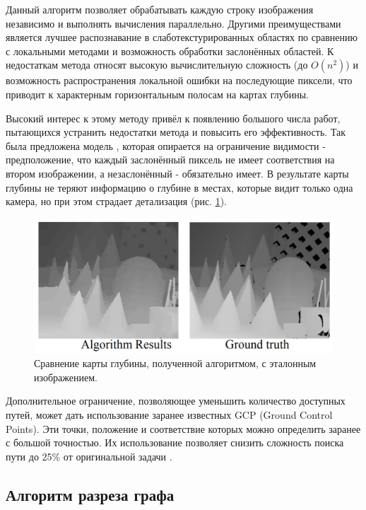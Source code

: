 Данный алгоритм позволяет обрабатывать каждую строку изображения независимо и выполнять вычисления параллельно. Другими преимуществами является лучшее распознавание в слаботекстурированных 
областях по сравнению с локальными методами и возможность обработки заслонённых областей.   %
К недостаткам метода относят высокую вычислительную сложность (до $O(n^2)$) и возможность распространения локальной ошибки на последующие пиксели, что приводит к характерным горизонтальным полосам на картах глубины. 

Высокий интерес к этому методу привёл к появлению большого числа работ, пытающихся устранить недостатки метода и повысить его эффективность. Так была предложена модель \cite{symmetric}, которая 
опирается на ограничение видимости - предположение, что каждый заслонённый пиксель не имеет соответствия на втором изображении, а незаслонённый - обязательно имеет. В результате карты глубины не теряют информацию о глубине 
в местах, которые видит только одна камера, но при этом страдает детализация (рис. \ref{pic:symmetry}). 
\begin{figure}[H]
	\begin{center}
		\includegraphics[scale=0.7]{pics/symmetric.png}
		\caption{ Сравнение карты глубины, полученной алгоритмом, с эталонным изображением. } 
		\label{pic:symmetry} %
	\end{center}
\end{figure}
Дополнительное ограничение, позволяющее уменьшить количество доступных путей, может дать использование заранее известных GCP (Ground Control Points). Эти точки, положение и 
соответствие которых можно определить заранее с большой точностью. Их использование позволяет снизить сложность поиска пути до 25\% от оригинальной задачи \cite{DSI}. 

\subsection{Алгоритм разреза графа}

